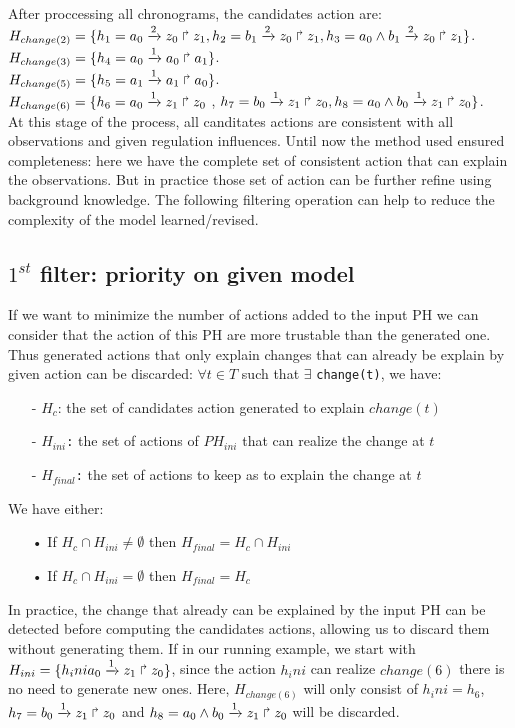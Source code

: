 After proccessing all chronograms, the candidates action are: \\
$H_{change(2)} = \{ h_1=a_0\xrightarrow{2} z_0 \Rsh z_1,  h_2=b_1\xrightarrow{2} z_0 \Rsh z_1 \\
,  h_3=a_0 \wedge b_1 \xrightarrow{2} z_0 \Rsh z_1 \}$.\\
$H_{change(3)} = \{ h_4=a_0\xrightarrow{1} a_0 \Rsh a_1  \}$. \\

$H_{change(5)} = \{ h_5=a_1\xrightarrow{1} a_1 \Rsh a_0  \}$. \\

$H_{change(6)} = \{ h_6=a_0\xrightarrow{1} z_1 \Rsh z_0$ , $  h_7=b_0\xrightarrow{1} z_1 \Rsh z_0
, h_8=a_0 \wedge b_0 \xrightarrow{1} z_1 \Rsh z_0 \}$. \\

At this stage of the process, all canditates actions are consistent with all observations and given regulation influences.
Until now the method used ensured completeness: here we have the complete set of consistent action that can explain the observations.
But in practice those set of action can be further refine using background knowledge.
The following filtering operation can help to reduce the complexity of the model learned/revised.

\subsection{$1^{st}$ filter: priority on given model}

If we want to minimize the number of actions added to the input PH we can consider that the action of this PH are more trustable than the generated one. Thus generated actions that only explain changes that can already be explain by given action can be discarded: $\forall t \in T$ such that $\exists$  \texttt{change(t)}, we have:
\begin{itemize}
\item[-] \texttt{$H_c$}: the set of candidates action generated to explain $change(t)$
\item[-] \texttt{$H_{ini}$:} the set of actions of $PH_{ini}$ that can realize the change at $t$
\item[-] \texttt{$H_{final}$:} the set of actions to keep as to explain the change at $t$
\end{itemize}
We have either:
\begin{itemize}
\item[•] If $H_c \cap H_{ini} \neq \emptyset $ then $H_{final}= H_c \cap H_{ini}$ 
\item[•] If $H_c \cap H_{ini} = \emptyset $ then $H_{final}=H_c$
\end{itemize}
In practice, the change that already can be explained by the input PH can be detected before computing the candidates actions, allowing us to discard them without generating them.
If in our running example,
we start with $H_{ini}=\{h_inia_0\xrightarrow{1} z_1 \Rsh z_0\}$,
since the action $h_ini$ can realize $change(6)$ there is no need to generate new ones.
Here, $H_{change(6)}$ will only consist of $h_ini = h_6$, $h_7=b_0\xrightarrow{1} z_1 \Rsh z_0$ and $h_8=a_0 \wedge b_0 \xrightarrow{1} z_1 \Rsh z_0 $ will be discarded. 

